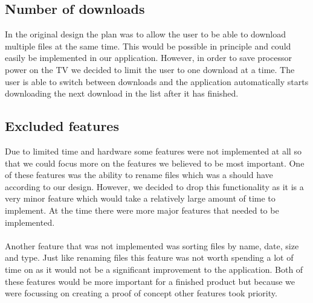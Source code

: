 \subsection{Number of downloads}

In the original design the plan was to allow the user to be able to download multiple files at the same time. This would be possible in principle and could easily be implemented in our application. However, in order to save processor power on the TV we decided to limit the user to one download at a time. The user is able to switch between downloads and the application automatically starts downloading the next download in the list after it has finished.

\subsection{Excluded features}

Due to limited time and hardware some features were not implemented at all so that we could focus more on the features we believed to be most important. One of these features was the ability to rename files which was a should have according to our design. However, we decided to drop this functionality as it is a very minor feature which would take a relatively large amount of time to implement. At the time there were more major features that needed to be implemented.
\\\\
Another feature that was not implemented was sorting files by name, date, size and type. Just like renaming files this feature was not worth spending a lot of time on as it would not be a significant improvement to the application. Both of these features would be more important for a finished product but because we were focussing on creating a proof of concept other features took priority.
